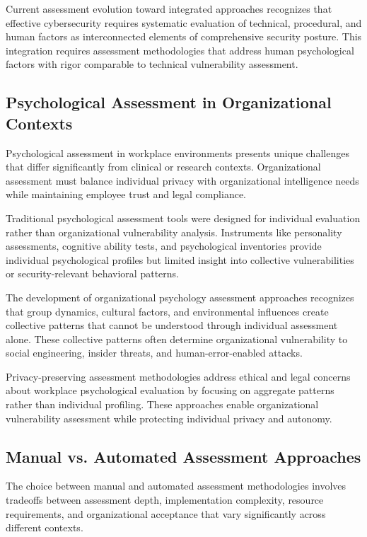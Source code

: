 \documentclass[10pt, twocolumn]{article}
\begin{document}
Current assessment evolution toward integrated approaches recognizes that effective cybersecurity requires systematic evaluation of technical, procedural, and human factors as interconnected elements of comprehensive security posture. This integration requires assessment methodologies that address human psychological factors with rigor comparable to technical vulnerability assessment.

\subsection{Psychological Assessment in Organizational Contexts}

Psychological assessment in workplace environments presents unique challenges that differ significantly from clinical or research contexts. Organizational assessment must balance individual privacy with organizational intelligence needs while maintaining employee trust and legal compliance.

Traditional psychological assessment tools were designed for individual evaluation rather than organizational vulnerability analysis. Instruments like personality assessments, cognitive ability tests, and psychological inventories provide individual psychological profiles but limited insight into collective vulnerabilities or security-relevant behavioral patterns.

The development of organizational psychology assessment approaches recognizes that group dynamics, cultural factors, and environmental influences create collective patterns that cannot be understood through individual assessment alone. These collective patterns often determine organizational vulnerability to social engineering, insider threats, and human-error-enabled attacks.

Privacy-preserving assessment methodologies address ethical and legal concerns about workplace psychological evaluation by focusing on aggregate patterns rather than individual profiling. These approaches enable organizational vulnerability assessment while protecting individual privacy and autonomy\cite{beauchamp2019}.

\subsection{Manual vs. Automated Assessment Approaches}

The choice between manual and automated assessment methodologies involves tradeoffs between assessment depth, implementation complexity, resource requirements, and organizational acceptance that vary significantly across different contexts.
\end{document}
